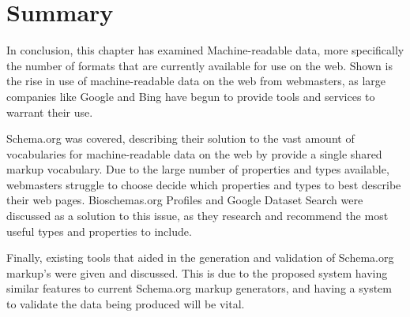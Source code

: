 \newpage 
\section{Summary}
In conclusion, this chapter has examined Machine-readable data, more specifically the number of formats that are currently available for use on the web. Shown is the rise in use of machine-readable data on the web from webmasters, as large companies like Google and Bing have begun to provide tools and services to warrant their use.

Schema.org was covered, describing their solution to the vast amount of vocabularies for machine-readable data on the web by provide a single shared markup vocabulary. Due to the large number of properties and types available, webmasters struggle to choose decide which properties and types to best describe their web pages. Bioschemas.org Profiles and Google Dataset Search were discussed as a solution to this issue, as they research and recommend the most useful types and properties to include.

Finally, existing tools that aided in the generation and validation of Schema.org markup's were given and discussed. This is due to the proposed system having similar features to current Schema.org markup generators, and having a system to validate the data being produced will be vital.


